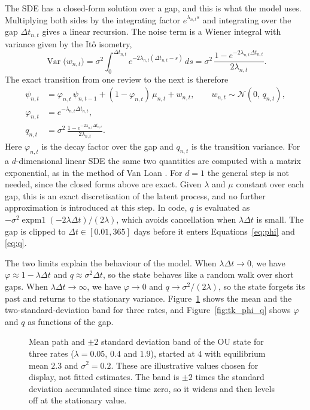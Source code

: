 The SDE has a closed-form solution over a gap, and this is what the model uses. Multiplying both
sides by the integrating factor $e^{\lambda_{n,t} s}$ and integrating over the gap
$\Delta t_{n,t}$ gives a linear recursion. The noise term is a Wiener integral with variance
given by the It\^o isometry,
\begin{equation}\label{eq:ou-var}
  \operatorname{Var}\!\bigl(w_{n,t}\bigr)
  = \sigma^2\int_0^{\Delta t_{n,t}} e^{-2\lambda_{n,t}(\Delta t_{n,t}-s)}\,ds
  = \sigma^2\,\frac{1-e^{-2\lambda_{n,t}\Delta t_{n,t}}}{2\lambda_{n,t}}.
\end{equation}
The exact transition from one review to the next is therefore
\begin{align}
  \psi_{n,t} &= \varphi_{n,t}\,\psi_{n,t-1} + (1-\varphi_{n,t})\,\mu_{n,t} + w_{n,t},
  \qquad w_{n,t} \sim \mathcal N(0,\, q_{n,t}), \label{eq:ou-recursion}\\
  \varphi_{n,t} &= e^{-\lambda_{n,t}\Delta t_{n,t}}, \label{eq:phi}\\
  q_{n,t} &= \sigma^2\,\frac{1-e^{-2\lambda_{n,t}\Delta t_{n,t}}}{2\lambda_{n,t}}. \label{eq:q}
\end{align}
Here $\varphi_{n,t}$ is the decay factor over the gap and $q_{n,t}$ is the transition variance. For
a $d$-dimensional linear SDE the same two quantities are computed with a matrix exponential, as in
the method of Van Loan \cite{vanloan1978computing}. For $d = 1$ the general step is not needed, since the closed forms above are exact. Given $\lambda$ and $\mu$ constant over each gap, this is an exact discretisation of the latent process, and no further approximation is introduced at this step. In code, $q$ is evaluated as $-\sigma^2\operatorname{expm1}(-2\lambda\Delta t)/(2\lambda)$,
which avoids cancellation when $\lambda\Delta t$ is small. The gap is clipped to
$\Delta t \in [0.01, 365]$ days before it enters Equations~\eqref{eq:phi} and \eqref{eq:q}.

The two limits explain the behaviour of the model. When $\lambda\Delta t \to 0$, we have
$\varphi \approx 1 - \lambda\Delta t$ and $q \approx \sigma^2\Delta t$, so the state behaves like a
random walk over short gaps. When $\lambda\Delta t \to \infty$, we have $\varphi \to 0$ and
$q \to \sigma^2/(2\lambda)$, so the state forgets its past and returns to the stationary variance.
Figure~\ref{fig:tk_ou_paths} shows the mean and the two-standard-deviation band for three rates,
and Figure~\ref{fig:tk_phi_q} shows $\varphi$ and $q$ as functions of the gap.

\begin{figure}[htbp]
  \centering
  
  \caption{Mean path and $\pm 2$ standard deviation band of the OU state for three rates
    ($\lambda = 0.05$, $0.4$ and $1.9$), started at $4$ with equilibrium mean $2.3$ and
    $\sigma^2 = 0.2$. These are illustrative values chosen for display, not fitted estimates. The
    band is $\pm 2$ times the standard deviation accumulated since time zero, so it widens and then
    levels off at the stationary value.}
  \label{fig:tk_ou_paths}
\end{figure}

